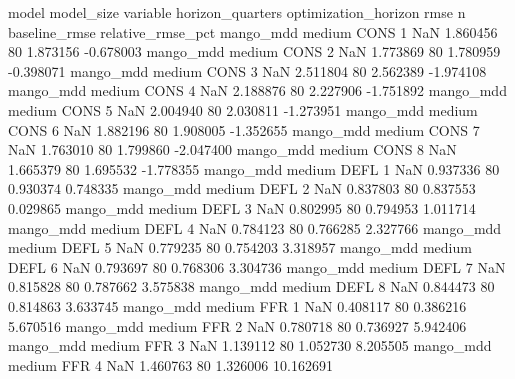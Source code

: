             model model_size variable  horizon_quarters optimization_horizon      rmse  n  baseline_rmse  relative_rmse_pct
        mango_mdd     medium     CONS                 1                  NaN  1.860456 80       1.873156          -0.678003
        mango_mdd     medium     CONS                 2                  NaN  1.773869 80       1.780959          -0.398071
        mango_mdd     medium     CONS                 3                  NaN  2.511804 80       2.562389          -1.974108
        mango_mdd     medium     CONS                 4                  NaN  2.188876 80       2.227906          -1.751892
        mango_mdd     medium     CONS                 5                  NaN  2.004940 80       2.030811          -1.273951
        mango_mdd     medium     CONS                 6                  NaN  1.882196 80       1.908005          -1.352655
        mango_mdd     medium     CONS                 7                  NaN  1.763010 80       1.799860          -2.047400
        mango_mdd     medium     CONS                 8                  NaN  1.665379 80       1.695532          -1.778355
        mango_mdd     medium     DEFL                 1                  NaN  0.937336 80       0.930374           0.748335
        mango_mdd     medium     DEFL                 2                  NaN  0.837803 80       0.837553           0.029865
        mango_mdd     medium     DEFL                 3                  NaN  0.802995 80       0.794953           1.011714
        mango_mdd     medium     DEFL                 4                  NaN  0.784123 80       0.766285           2.327766
        mango_mdd     medium     DEFL                 5                  NaN  0.779235 80       0.754203           3.318957
        mango_mdd     medium     DEFL                 6                  NaN  0.793697 80       0.768306           3.304736
        mango_mdd     medium     DEFL                 7                  NaN  0.815828 80       0.787662           3.575838
        mango_mdd     medium     DEFL                 8                  NaN  0.844473 80       0.814863           3.633745
        mango_mdd     medium      FFR                 1                  NaN  0.408117 80       0.386216           5.670516
        mango_mdd     medium      FFR                 2                  NaN  0.780718 80       0.736927           5.942406
        mango_mdd     medium      FFR                 3                  NaN  1.139112 80       1.052730           8.205505
        mango_mdd     medium      FFR                 4                  NaN  1.460763 80       1.326006          10.162691
